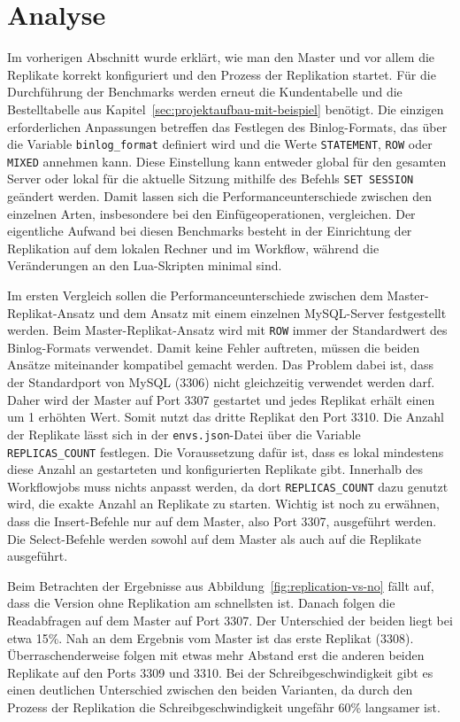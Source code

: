 \section{Analyse}\label{sec:replication-analyse}

Im vorherigen Abschnitt wurde erklärt, wie man den Master und vor allem die Replikate korrekt konfiguriert und den Prozess der Replikation startet.
Für die Durchführung der Benchmarks werden erneut die Kundentabelle und die Bestelltabelle aus Kapitel~\ref{sec:projektaufbau-mit-beispiel} benötigt.
Die einzigen erforderlichen Anpassungen betreffen das Festlegen des Binlog-Formats, das über die Variable \texttt{binlog\_format} definiert wird und die Werte \texttt{STATEMENT}, \texttt{ROW} oder \texttt{MIXED} annehmen kann.
Diese Einstellung kann entweder global für den gesamten Server oder lokal für die aktuelle Sitzung mithilfe des Befehls \texttt{SET SESSION} geändert werden.
Damit lassen sich die Performanceunterschiede zwischen den einzelnen Arten, insbesondere bei den Einfügeoperationen, vergleichen.
Der eigentliche Aufwand bei diesen Benchmarks besteht in der Einrichtung der Replikation auf dem lokalen Rechner und im Workflow, während die Veränderungen an den Lua-Skripten minimal sind.

Im ersten Vergleich sollen die Performanceunterschiede zwischen dem Master-Replikat-Ansatz und dem Ansatz mit einem einzelnen MySQL-Server festgestellt werden.
Beim Master-Replikat-Ansatz wird mit \texttt{ROW} immer der Standardwert des Binlog-Formats verwendet.
Damit keine Fehler auftreten, müssen die beiden Ansätze miteinander kompatibel gemacht werden.
Das Problem dabei ist, dass der Standardport von MySQL (3306) nicht gleichzeitig verwendet werden darf.
Daher wird der Master auf Port 3307 gestartet und jedes Replikat erhält einen um 1 erhöhten Wert.
Somit nutzt das dritte Replikat den Port 3310.
Die Anzahl der Replikate lässt sich in der \texttt{envs.json}-Datei über die Variable \texttt{REPLICAS\_COUNT} festlegen.
Die Voraussetzung dafür ist, dass es lokal mindestens diese Anzahl an gestarteten und konfigurierten Replikate gibt.
Innerhalb des Workflowjobs muss nichts anpasst werden, da dort \texttt{REPLICAS\_COUNT} dazu genutzt wird, die exakte Anzahl an Replikate zu starten.
Wichtig ist noch zu erwähnen, dass die Insert-Befehle nur auf dem Master, also Port 3307, ausgeführt werden.
Die Select-Befehle werden sowohl auf dem Master als auch auf die Replikate ausgeführt.

Beim Betrachten der Ergebnisse aus Abbildung~\ref{fig:replication-vs-no} fällt auf, dass die Version ohne Replikation am schnellsten ist.
Danach folgen die Readabfragen auf dem Master auf Port 3307.
Der Unterschied der beiden liegt bei etwa 15\%.
Nah an dem Ergebnis vom Master ist das erste Replikat (3308).
Überraschenderweise folgen mit etwas mehr Abstand erst die anderen beiden Replikate auf den Ports 3309 und 3310.
Bei der Schreibgeschwindigkeit gibt es einen deutlichen Unterschied zwischen den beiden Varianten, da durch den Prozess der Replikation die Schreibgeschwindigkeit ungefähr 60\% langsamer ist.


